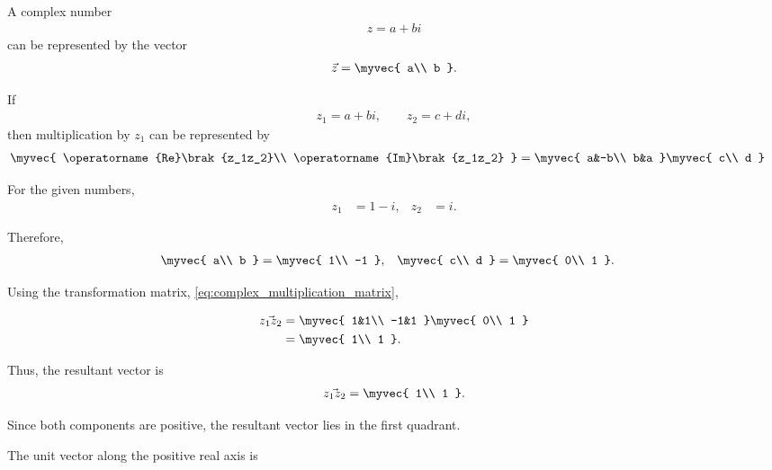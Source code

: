 \begin{enumerate}[label=\thesubsection.\arabic*, ref=\thesubsection.\theenumi,itemsep=0pt]
\solution

A complex number
\begin{align}
z=a+bi
\end{align}
can be represented by the vector
\begin{align}
\vec{z}
=
\myvec{
a\\
b
}.
\label{eq:q13_complex_vector}
\end{align}

If
\begin{align}
z_1=a+bi,
\qquad
z_2=c+di,
\end{align}
then multiplication by $z_1$ can be represented by
\begin{align}
\myvec{
\operatorname{Re}\brak{z_1z_2}\\
\operatorname{Im}\brak{z_1z_2}
}
&=
\myvec{
a&-b\\
b&a
}
\myvec{
c\\
d
}
\label{eq:q13_complex_transformation}
\end{align}

For the given numbers,
\begin{align}
z_1&=1-i,
&
z_2&=i.
\end{align}

Therefore,
\begin{align}
\myvec{
a\\
b
}
&=
\myvec{
1\\
-1
},
&
\myvec{
c\\
d
}
&=
\myvec{
0\\
1
}.
\end{align}

Using the transformation matrix, \eqref{eq:complex_multiplication_matrix},

\begin{align}
\vec{z_1z_2}
&=
\myvec{
1&1\\
-1&1
}
\myvec{
0\\
1
}
\\
&=
\myvec{
1\\
1
}.
\label{eq:q13_resultant_vector}
\end{align}

Thus, the resultant vector is
\begin{align}
\vec{z_1z_2}
=
\myvec{
1\\
1
}.
\end{align}

Since both components are positive, the resultant vector lies in the
first quadrant.

The unit vector along the positive real axis is


\end{enumerate}
